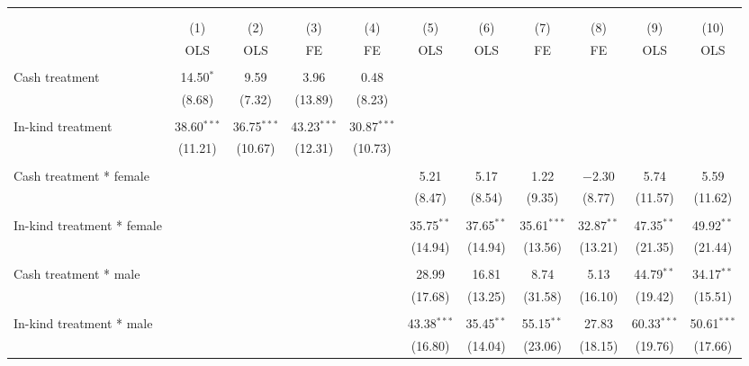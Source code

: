 \documentclass{report}
\begin{document}
\pagestyle{empty}

\begin{table}[!htbp] \centering 
  \caption{} 
  \label{} 
\begin{tabular}{@{\extracolsep{5pt}}lcccccccccc} 
\\[-1.8ex]\hline 
\hline \\[-1.8ex] 
\\[-1.8ex] & (1) & (2) & (3) & (4) & (5) & (6) & (7) & (8) & (9) & (10)\\ 
 & OLS & OLS & FE & FE & OLS & OLS & FE & FE & OLS & OLS \\ 
\hline \\[-1.8ex] 
 Cash treatment & 14.50$^{*}$ & 9.59 & 3.96 & 0.48 &  &  &  &  &  &  \\ 
  & (8.68) & (7.32) & (13.89) & (8.23) &  &  &  &  &  &  \\ 
  & & & & & & & & & & \\ 
 In-kind treatment & 38.60$^{***}$ & 36.75$^{***}$ & 43.23$^{***}$ & 30.87$^{***}$ &  &  &  &  &  &  \\ 
  & (11.21) & (10.67) & (12.31) & (10.73) &  &  &  &  &  &  \\ 
  & & & & & & & & & & \\ 
 Cash treatment * female &  &  &  &  & 5.21 & 5.17 & 1.22 & $-$2.30 & 5.74 & 5.59 \\ 
  &  &  &  &  & (8.47) & (8.54) & (9.35) & (8.77) & (11.57) & (11.62) \\ 
  & & & & & & & & & & \\ 
 In-kind treatment * female &  &  &  &  & 35.75$^{**}$ & 37.65$^{**}$ & 35.61$^{***}$ & 32.87$^{**}$ & 47.35$^{**}$ & 49.92$^{**}$ \\ 
  &  &  &  &  & (14.94) & (14.94) & (13.56) & (13.21) & (21.35) & (21.44) \\ 
  & & & & & & & & & & \\ 
 Cash treatment * male &  &  &  &  & 28.99 & 16.81 & 8.74 & 5.13 & 44.79$^{**}$ & 34.17$^{**}$ \\ 
  &  &  &  &  & (17.68) & (13.25) & (31.58) & (16.10) & (19.42) & (15.51) \\ 
  & & & & & & & & & & \\ 
 In-kind treatment * male &  &  &  &  & 43.38$^{***}$ & 35.45$^{**}$ & 55.15$^{**}$ & 27.83 & 60.33$^{***}$ & 50.61$^{***}$ \\ 
  &  &  &  &  & (16.80) & (14.04) & (23.06) & (18.15) & (19.76) & (17.66) \\ 

\end{tabular}
\end{table}
\end{document}

